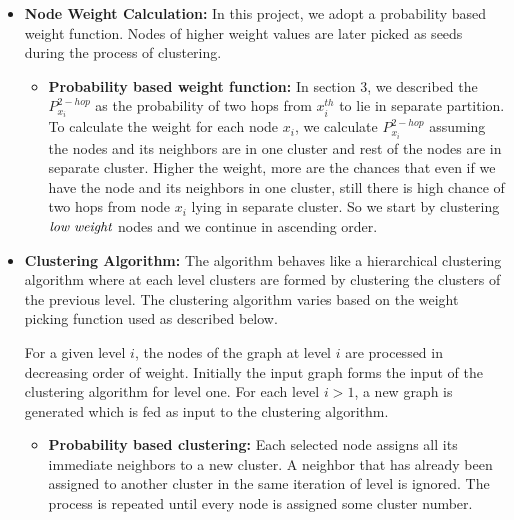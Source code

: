 \documentclass[letterpaper]{article}
\begin{document}
\begin{itemize} %

\item \textbf{Node Weight Calculation:} In this project, we adopt a probability
based weight function.  Nodes of higher weight values are later picked as seeds
during the process of clustering. 

\begin{itemize} %

\item \textbf{Probability based weight function:}  
In section 3, we described the $P_{x_i}^{2-hop}$ as the probability of two hops
from $x_i^{th}$ to lie in separate partition. To calculate the weight for each
node $x_i$, we calculate $P_{x_i}^{2-hop}$ assuming the nodes and its neighbors
are in one cluster and rest of the nodes are in separate cluster. Higher the
weight, more are the chances that even if we have the node and its neighbors in
one cluster, still there is high chance of two hops from node $x_i$ lying in
separate cluster. So we start by clustering $\emph{low weight}$ nodes and we
continue in ascending order.
 


\end{itemize} %



\item \textbf{Clustering Algorithm:} The algorithm behaves like a hierarchical
clustering algorithm where at each level clusters are formed by clustering the
clusters of the previous level. The clustering algorithm varies based on the
weight picking function used as described below.



For a given level $i$, the nodes of the graph at level $i$ are processed in
decreasing order of weight. Initially the input graph forms the input of the
clustering algorithm for level one. For each level $i >1$, a new graph is
generated which is fed as input to the clustering algorithm.

\begin{itemize} %

\item \textbf{Probability based clustering:} Each selected node assigns all its immediate neighbors to a new cluster. 
A neighbor that has already been assigned to another cluster in the same iteration of level is ignored. 
The process is repeated until every node is assigned some cluster number.




\end{itemize}
\end{itemize}
\end{document}
